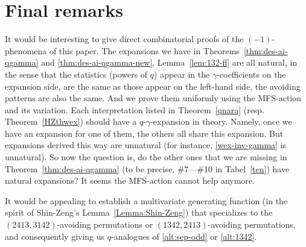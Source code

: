\documentclass[12pt,reqno]{amsart}
\numberwithin{equation}{section}
\def\red{\textcolor{red}}
\theoremstyle{plain}
\newtheorem{theorem}{Theorem}[section]
\theoremstyle{definition}
\def\MM{\mathfrak{M}}
\def\bca{2\text{-}31}
\def\neg{\mathsf{neg}}
\def\pa{\mathsf{pa}}
\begin{document}
\section{Final remarks}
It would be interesting to give direct combinatorial proofs of the $(-1)$-phenomena of this paper. The expansions we have in Theorems~\ref{thm:des-ai-qgamma} and \ref{thm:des-ai-qgamma-new}, Lemma~\ref{lem:132-fl} are all natural, in the sense that the statistics (powers of $q$) appear in the $\gamma$-coefficients on the expansion side, are the same as those appear on the left-hand side, the avoiding patterns are also the same. And we prove them uniformly using the MFS-action and its variation. Each interpretation listed in Theorem~\ref{qnara} (resp. Theorem~\ref{HZthwex}) should have a $q$-$\gamma$-expansion in theory. Namely, once we have an expansion for one of them, the others all share this expansion. But expansions derived this way are unnatural (for instance, \eqref{wex-inv-gamma} is unnatural).  So now the question is, do the other ones that we are missing in Theorem~\ref{thm:des-ai-qgamma} (to be precise, \#7---\#10 in Tabel~\ref{ten}) have natural expansions? It seems the MFS-action cannot help anymore.

It would be appealing to establish a multivariate generating function (in the spirit of Shin-Zeng's Lemma~\ref{Lemma:Shin-Zeng}) that specializes to the $(2413, 3142)$-avoiding permutations or $(1342, 2413)$-avoiding permutations, and consequently giving us $q$-analogues of \eqref{alt:sep-odd} or \eqref{alt:1342}.

\end{document}
